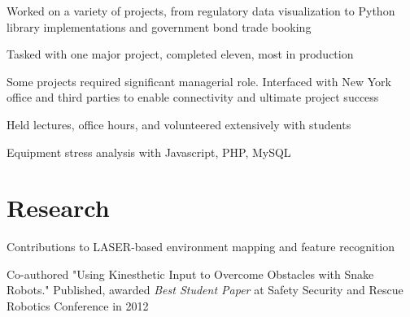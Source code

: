\documentclass[letterpaper]{deedy-resume}
\begin{document}
\begin{minipage}[t]{0.66\textwidth}
        \begin{tightitemize}
          \item Worked on a variety of projects, from regulatory data
            visualization to Python library implementations and government bond
            trade booking
          \item Tasked with one major project, completed eleven, most in
            production
          \item Some projects required significant managerial role. Interfaced
            with New York office and third parties to enable connectivity and
            ultimate project success
        \end{tightitemize}


        \begin{tightitemize}
          \item Held lectures, office hours, and volunteered extensively with
            students
        \end{tightitemize}


        \begin{tightitemize}
          \item Equipment stress analysis with Javascript, PHP, MySQL
        \end{tightitemize}

    \sectionspace

    \section{Research}

        \begin{tightitemize}
          \item Contributions to LASER-based environment mapping and feature
            recognition
          \item Co-authored
            "Using Kinesthetic Input to Overcome Obstacles with Snake Robots."
            Published, awarded \textit{Best Student Paper} at Safety
            Security and Rescue Robotics Conference in 2012
        \end{tightitemize}


\end{minipage}
\end{document}

